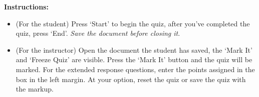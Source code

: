 \documentclass{article}
\begin{document}

\thQuizHeader

\noindent\textbf{Instructions:}
\begin{itemize}
\item (For the student) Press `\textsf{Start}' to begin the
    quiz, after you've completed the quiz, press
    `\textsf{End}'. \emph{Save the document before closing
    it}.
\item (For the instructor) Open the document the student has
    saved, the `\textsf{Mark It}' and `\textsf{Freeze Quiz}'
    are visible. Press the `\textsf{Mark It}' button and the
    quiz will be marked. For the extended response questions,
    enter the points assigned in the box in the left margin.
    At your option, reset the quiz or save the quiz with the
    markup.
\end{itemize}
\end{document}
